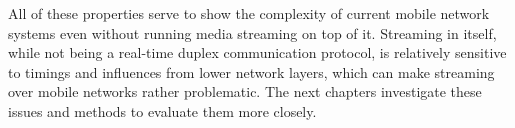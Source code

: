 All of these properties serve to show the complexity of current mobile network systems even without running media streaming on top of it. Streaming in itself, while not being a real-time duplex communication protocol, is relatively sensitive to timings and influences from lower network layers, which can make streaming over mobile networks rather problematic. The next chapters investigate these issues and methods to evaluate them more closely.




